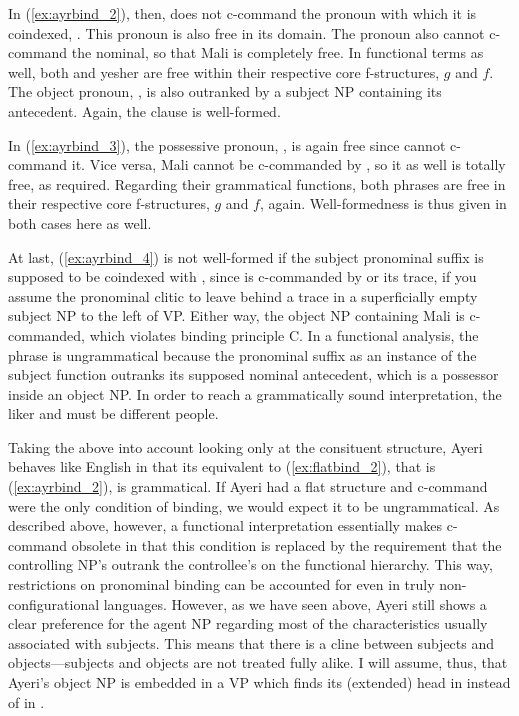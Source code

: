 In (\ref{ex:ayrbind_2}), then,  does not c-command the pronoun
with which it is coindexed, . This pronoun is also free in
its domain. The pronoun also cannot c-command the nominal, so that 
{Mali} is completely free. In functional terms as well, both 
and  {yes}{her} are free within their respective core f-structures,
$g$ and $f$. The object pronoun, , is also outranked by a
subject NP containing its antecedent. Again, the clause is well-formed.

In (\ref{ex:ayrbind_3}), the possessive pronoun, , is
again free since  cannot c-command it. Vice versa, 
{Mali} cannot be c-commanded by , so it as well is totally
free, as required. Regarding their grammatical functions, both phrases are free
in their respective core f-structures, $g$ and $f$, again. Well-formedness is
thus given in both cases here as well.

At last, (\ref{ex:ayrbind_4}) is not well-formed if the subject pronominal
suffix  is supposed to be coindexed with ,
since  is c-commanded by  or its trace, if you
assume the pronominal clitic to leave behind a trace in a superficially empty
subject NP to the left of VP. Either way, the object NP containing 
{Mali} is c-commanded, which violates binding principle C. In a functional
analysis, the phrase is ungrammatical because the pronominal suffix as an
instance of the subject function outranks its supposed nominal antecedent,
which is a possessor inside an object NP. In order to reach a grammatically
sound interpretation, the liker and  must be different people.

Taking the above into account looking only at the consituent structure, Ayeri
behaves like English in that its equivalent to (\ref{ex:flatbind_2}), that is
(\ref{ex:ayrbind_2}), is grammatical. If Ayeri had a flat structure and
c-command were the only condition of binding, we would expect it to be
ungrammatical. As described above, however, a functional interpretation
essentially makes c-command obsolete in that this condition is replaced by the
requirement that the controlling NP's \GF{} outrank the controllee's on the
functional hierarchy. This way, restrictions on pronominal binding can be
accounted for even in truly non-configurational languages. However, as we have
seen above, Ayeri still shows a clear preference for the agent NP regarding
most of the characteristics usually associated with subjects. This means that
there is a cline between subjects and objects---subjects and objects are not
treated fully alike. I will assume, thus, that Ayeri's object NP is embedded
in a VP which finds its (extended) head in  instead of in .

